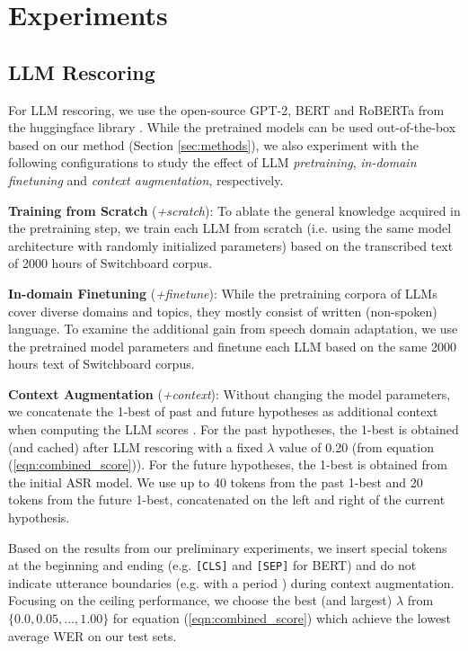 \documentclass[a4paper]{article}
\begin{document}
\section{Experiments}
\label{sec:experiments}

\subsection{LLM Rescoring}
\label{subsec:llm_based_rescoring}

For LLM rescoring, we use the open-source GPT-2, BERT and RoBERTa from the huggingface library \cite{wolf-etal-2020-transformers}. While the pretrained models can be used out-of-the-box based on our method (Section \ref{sec:methods}), we also experiment with the following configurations to study the effect of LLM \textit{pretraining}, \textit{in-domain finetuning} and \textit{context augmentation}, respectively.

\textbf{Training from Scratch} (\textit{+scratch}):
To ablate the general knowledge acquired in the pretraining step, we train each LLM from scratch (i.e. using the same model architecture with randomly initialized parameters) based on the transcribed text of 2000 hours of Switchboard corpus.

\textbf{In-domain Finetuning} (\textit{+finetune}):
While the pretraining corpora of LLMs cover diverse domains and topics, they mostly consist of written (non-spoken) language. To examine the additional gain from speech domain adaptation, we use the pretrained model parameters and finetune each LLM based on the same 2000 hours text of Switchboard corpus.

\textbf{Context Augmentation} (\textit{+context}):
Without changing the model parameters, we concatenate the 1-best of past and future hypotheses as additional context when computing the LLM scores \cite{Zheng2021AdaptingGG}. For the past hypotheses, the 1-best is obtained (and cached) after LLM rescoring with a fixed $\lambda$ value of 0.20 (from equation (\ref{eqn:combined_score})). For the future hypotheses, the 1-best is obtained from the initial ASR model. We use up to 40 tokens from the past 1-best and 20 tokens from the future 1-best, concatenated on the left and right of the current hypothesis.

Based on the results from our preliminary experiments, we insert special tokens at the beginning and ending (e.g. \texttt{[CLS]} and \texttt{[SEP]} for BERT) and do not indicate utterance boundaries (e.g. with a period \cite{Zheng2021AdaptingGG}) during context augmentation.  Focusing on the ceiling performance, we choose the best (and largest) $\lambda$ from $\{0.0, 0.05, ..., 1.00\}$ for equation (\ref{eqn:combined_score}) which achieve the lowest average WER on our test sets.
\end{document}
